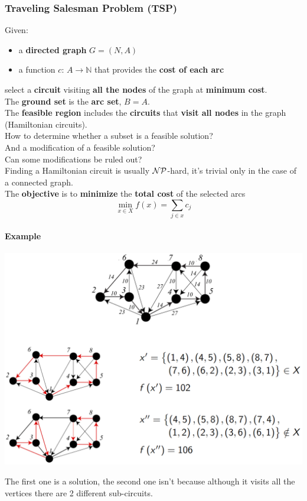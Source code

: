 \newpage

\subsubsection{Traveling Salesman Problem (TSP)}
Given:
\begin{itemize}
	\item a \textbf{directed graph} $G = (N, A)$
	\item a function $c : \, A \rightarrow \mathbb{N}$ that provides the \textbf{cost of each arc}
\end{itemize}
select a \textbf{circuit} visiting \textbf{all the nodes} of the graph at \textbf{minimum cost}.\\

The \textbf{ground set} is the \textbf{arc set}, $B = A$.\\

The \textbf{feasible region} includes the \textbf{circuits} that \textbf{visit all nodes} in the graph (Hamiltonian circuits).\\

How to determine whether a subset is a feasible solution? \\
And a modification of a feasible solution? \\
Can some modifications be ruled out? \\
Finding a Hamiltonian circuit is usually $\mathcal{NP}$-hard, it's trivial only in the case of a connected graph. \\

The \textbf{objective} is to \textbf{minimize} the \textbf{total cost} of the selected arcs
$$ \min_{x \in X} f(x) = \sum_{j \in x} c_j $$

\newpage

\paragraph{Example}
\begin{center}
	\includegraphics[width=\columnwidth]{img/TSP1}
\end{center}
The first one is a solution, the second one isn't because although it visits all the vertices there are 2 different sub-circuits.\\

